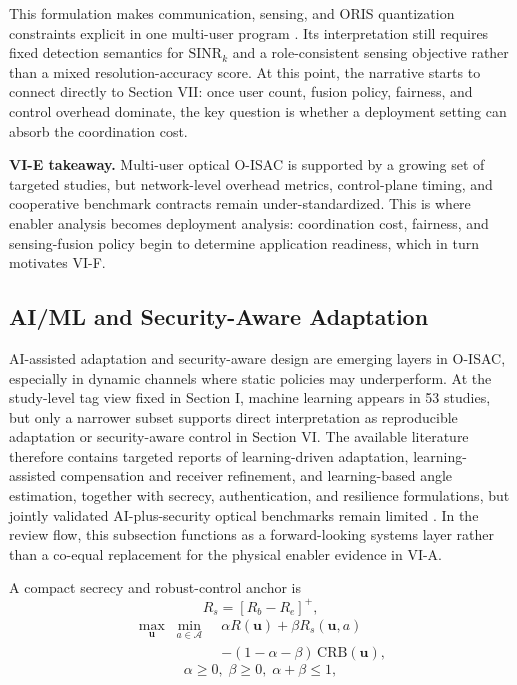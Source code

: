 This formulation makes communication, sensing, and ORIS quantization constraints explicit in one multi-user program \cite{O_ISAC_061,O_ISAC_091,O_ISAC_127}. Its interpretation still requires fixed detection semantics for $\mathrm{SINR}_k$ and a role-consistent sensing objective rather than a mixed resolution-accuracy score. At this point, the narrative starts to connect directly to Section VII: once user count, fusion policy, fairness, and control overhead dominate, the key question is whether a deployment setting can absorb the coordination cost.

\textbf{VI-E takeaway.} Multi-user optical O-ISAC is supported by a growing set of targeted studies, but network-level overhead metrics, control-plane timing, and cooperative benchmark contracts remain under-standardized. This is where enabler analysis becomes deployment analysis: coordination cost, fairness, and sensing-fusion policy begin to determine application readiness, which in turn motivates VI-F.

\subsection{AI/ML and Security-Aware Adaptation}

AI-assisted adaptation and security-aware design are emerging layers in O-ISAC, especially in dynamic channels where static policies may underperform. At the study-level tag view fixed in Section I, machine learning appears in 53 studies, but only a narrower subset supports direct interpretation as reproducible adaptation or security-aware control in Section VI. The available literature therefore contains targeted reports of learning-driven adaptation, learning-assisted compensation and receiver refinement, and learning-based angle estimation, together with secrecy, authentication, and resilience formulations, but jointly validated AI-plus-security optical benchmarks remain limited \cite{O_ISAC_017,O_ISAC_127,O_ISAC_145,O_ISAC_156,O_ISAC_157,O_ISAC_163,O_ISAC_245}. In the review flow, this subsection functions as a forward-looking systems layer rather than a co-equal replacement for the physical enabler evidence in VI-A.

A compact secrecy and robust-control anchor is
\begin{equation}
    R_s=[R_b-R_e]^+,
\end{equation}
\begin{equation}
    \begin{split}
        \max_{\mathbf{u}}\;\min_{a\in\mathcal A}\; & \alpha R(\mathbf{u})+\beta R_s(\mathbf{u},a) \\
                                                   & -(1-\alpha-\beta)\,\mathrm{CRB}(\mathbf{u}),
    \end{split}
\end{equation}
\begin{equation}
    \alpha\ge 0,\;\beta\ge 0,\;\alpha+\beta\le 1,
\end{equation}


